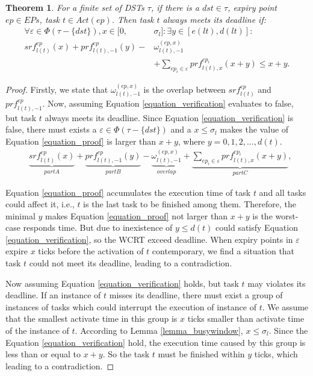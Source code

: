 \documentclass[10pt,conference]{IEEEtran}
\newtheorem{theorem}{Theorem}
\begin{document}
\begin{theorem}\label{theorem_testtask}
  For a finite set of DSTs $\tau$, if there is a $dst\in\tau$, expiry point $ep\in EPs$, task $t\in Act(ep)$. Then task $t$ always meets its deadline if:
   \begin{equation}\begin{split}
      \forall \varepsilon\in\Phi(\tau-\{dst\}),x\in[0,&\sigma_l]:\exists y\in[e(lt),d(lt)]:
      \\
      srf^{ep}_{l(t)}(x)+prf^{ep}_{l(t),-1}(y)-&\omega_{l(t),-1}^{(ep,x)}
      \\
      &+\sum\limits_{ep_i\in \varepsilon}prf^{ep_i}_{l(t),x}(x+y)\leq x+y.
    \end{split}\label{equation_verification}\end{equation}
\end{theorem}
\begin{proof}

  Firstly, we state that $\omega_{l(t),-1}^{(ep,x)}$ is the overlap between $srf^{ep}_{l(t)}$ and $prf^{ep}_{l(t),-1}$. Now, assuming Equation \ref{equation_verification} evaluates to false, but task $t$ always meets its deadline. Since Equation \ref{equation_verification} is false, there must exists a $\varepsilon\in\Phi(\tau-\{dst\})$ and a $x\leq \sigma_l$ makes the value of Equation \ref{equation_proof} is larger than $x+y$, where $y=0,1,2,\dots,d(t)$.
  \begin{equation}\begin{split}
      &\underbrace{srf^{ep}_{l(t)}(x)}_{part A}+\underbrace{prf^{ep}_{l(t),-1}(y)}_{part B}-\underbrace{\omega^{(ep,x)}_{l(t),-1}}_{overlap}+\underbrace{\sum\limits_{ep_i\in \varepsilon}prf^{ep_i}_{l(t),x}(x+y)}_{part C},
    \end{split}\label{equation_proof}\end{equation}
  
  Equation \ref{equation_proof} accumulates the execution time of task $t$ and all tasks could affect it, i.e., $t$ is the last task to be finished among them. Therefore, the minimal $y$ makes Equation \ref{equation_proof} not larger than $x+y$ is the worst-case responds time. But due to inexistence of $y\leq d(t)$ could satisfy Equation \ref{equation_verification}, so the WCRT exceed deadline. When expiry points in $\varepsilon$ expire $x$ ticks before the activation of $t$ contemporary, we find a situation that task $t$ could not meet its deadline, leading to a contradiction. 
  
  Now assuming Equation \ref{equation_verification} holds, but task $t$ may violates its deadline. If an instance of $t$ misses its deadline, there must exist a group of instances of tasks which could interrupt the execution of instance of $t$. We assume that the smallest activate time in this group is $x$ ticks smaller than activate time of the instance of $t$. According to Lemma \ref{lemma_busywindow}, $x\leq \sigma_l$. Since the Equation \ref{equation_verification} hold, the execution time caused by this group is less than or equal to $x+y$. So the task $t$ must be finished within $y$ ticks, which leading to a contradiction.
\end{proof}
\end{document}
